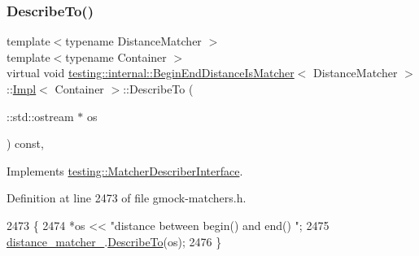 \subsubsection{\texorpdfstring{Describe\+To()}{DescribeTo()}}
{\footnotesize\ttfamily template$<$typename Distance\+Matcher $>$ \\
template$<$typename Container $>$ \\
virtual void \hyperlink{classtesting_1_1internal_1_1BeginEndDistanceIsMatcher}{testing\+::internal\+::\+Begin\+End\+Distance\+Is\+Matcher}$<$ Distance\+Matcher $>$\+::\hyperlink{classtesting_1_1internal_1_1BeginEndDistanceIsMatcher_1_1Impl}{Impl}$<$ Container $>$\+::Describe\+To (\begin{DoxyParamCaption}\item[{\+::std\+::ostream $\ast$}]{os }\end{DoxyParamCaption}) const\hspace{0.3cm}{\ttfamily [inline]}, {\ttfamily [virtual]}}



Implements \hyperlink{classtesting_1_1MatcherDescriberInterface_ad9f861588bd969b6e3e717f13bb94e7b}{testing\+::\+Matcher\+Describer\+Interface}.



Definition at line 2473 of file gmock-\/matchers.\+h.


\begin{DoxyCode}
2473                                                   \{
2474       *os << \textcolor{stringliteral}{"distance between begin() and end() "};
2475       \hyperlink{classtesting_1_1internal_1_1BeginEndDistanceIsMatcher_1_1Impl_acc8d923e6901fa9c75bf76825b2baa6b}{distance\_matcher\_}.\hyperlink{classtesting_1_1internal_1_1MatcherBase_a7e0c883c7745e0d646463077ef1c1267}{DescribeTo}(os);
2476     \}
\end{DoxyCode}
\mbox{\label{classtesting_1_1internal_1_1BeginEndDistanceIsMatcher_1_1Impl_a39ce69387cb535e4e9932a4f0452538d}} 
